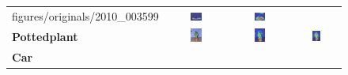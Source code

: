 \begin{figure}[ht]
\begin{tcolorbox}[colframe=black!60, colback=white, boxrule=0.8pt, arc=2pt, left=2pt, right=2pt, top=2pt, bottom=2pt]
\begin{tabular}{m{3cm} c c c}
      {figures/originals/2010_003599}
       & \includegraphics[width=0.20\textwidth,height=0.20\textwidth]
      {figures/val_cams/weclip/2010_003599_3}
       & \includegraphics[width=0.20\textwidth,height=0.20\textwidth]
      {figures/val_cams/ours/2010_003599_3}
      \\
      \textbf{Pottedplant}
       & \includegraphics[width=0.20\textwidth,height=0.20\textwidth]
      {figures/originals/2011_000145}
       & \includegraphics[width=0.20\textwidth,height=0.20\textwidth]
      {figures/val_cams/weclip/2011_000145_15}
       & \includegraphics[width=0.20\textwidth,height=0.20\textwidth]
      {figures/val_cams/ours/2011_000145_15}
      \\
      \textbf{Car}
       & \includegraphics[width=0.20\textwidth,height=0.20\textwidth]

\end{tabular}
\end{tcolorbox}
\end{figure}
